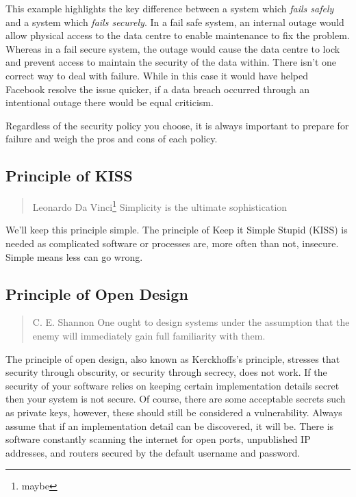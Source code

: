 This example highlights the key difference between a system which \textsl{fails safely} and a system which \textsl{fails securely}.
In a fail safe system, an internal outage would allow physical access to the data centre to enable maintenance to fix the problem.
Whereas in a fail secure system, the outage would cause the data centre to lock and prevent access to maintain the security of the data within.
There isn't one correct way to deal with failure.
While in this case it would have helped Facebook resolve the issue quicker,
if a data breach occurred through an intentional outage there would be equal criticism.

Regardless of the security policy you choose, it is always important to prepare for failure and weigh the pros and cons of each policy.

\subsection{Principle of KISS}

\begin{quote}{Leonardo Da Vinci\footnote{maybe}}
Simplicity is the ultimate sophistication
\end{quote}

\noindent We'll keep this principle simple.
The principle of Keep it Simple Stupid (KISS) is needed as complicated software or processes are, more often than not, insecure.
Simple means less can go wrong.

\subsection{Principle of Open Design}

\begin{quote}{C. E. Shannon \cite{shannons-maxim}}
One ought to design systems under the assumption that the enemy will immediately gain full familiarity with them.
\end{quote}

\noindent The principle of open design, also known as Kerckhoffs's principle,
stresses that security through obscurity, or security through secrecy, does not work.
If the security of your software relies on keeping certain implementation details secret then your system is not secure.
Of course, there are some acceptable secrets such as private keys, however, these should still be considered a vulnerability.
Always assume that if an implementation detail can be discovered, it will be.
There is software constantly scanning the internet for open ports, unpublished IP addresses,
and routers secured by the default username and password.

